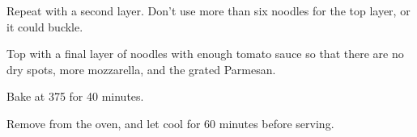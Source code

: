\begin{recipe}
Repeat with a second layer. Don't use more than six noodles for the top layer, or it could buckle. 


Top with a final layer of noodles with enough tomato sauce so that there are no dry spots, more mozzarella, and the grated Parmesan.

Bake at 375\degree{} for 40 minutes.

Remove from the oven, and let cool for 60 minutes before serving.

\end{recipe}
